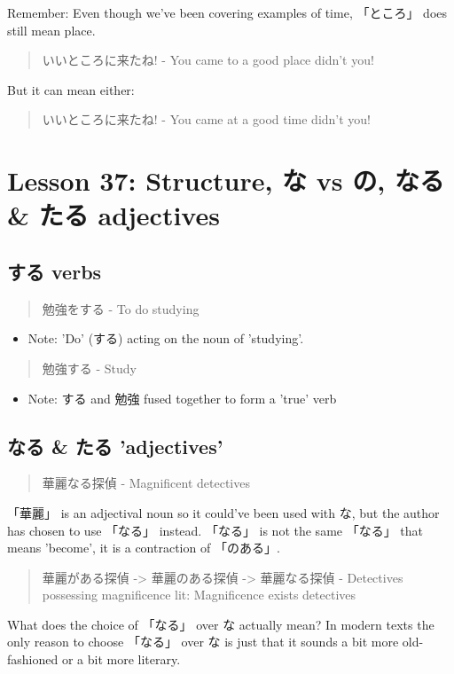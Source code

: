 \documentclass[11pt]{article}
\begin{document}
Remember: Even though we've been covering examples of time, 「ところ」 does still mean place.
\begin{quote}
いいところに来たね! - You came to a good place didn't you!
\end{quote}
But it can mean either:
\begin{quote}
いいところに来たね! - You came at a good time didn't you!
\end{quote}
\section{Lesson 37: Structure, な vs の, なる \& たる adjectives}
\label{sec:orgfabcc95}
\subsection{する verbs}
\label{sec:orge36d422}
\begin{quote}
勉強をする - To do studying
\end{quote}
\begin{itemize}
\item Note: 'Do' (する) acting on the noun of 'studying'.
\end{itemize}
\begin{quote}
勉強する - Study
\end{quote}
\begin{itemize}
\item Note: する and 勉強 fused together to form a 'true' verb
\end{itemize}

\subsection{なる \& たる 'adjectives'}
\label{sec:orge5735c1}
\begin{quote}
華麗なる探偵 - Magnificent detectives
\end{quote}
「華麗」 is an adjectival noun so it could've been used with な, but the author has chosen to use 「なる」 instead. 「なる」 is not the same 「なる」 that means 'become', it is a contraction of 「のある」.

\begin{quote}
華麗がある探偵 -> 華麗のある探偵 -> 華麗なる探偵 - Detectives possessing magnificence lit: Magnificence exists detectives
\end{quote}
What does the choice of 「なる」 over な actually mean? In modern texts the only reason to choose 「なる」 over な is just that it sounds a bit more old-fashioned or a bit more literary.
\end{document}
